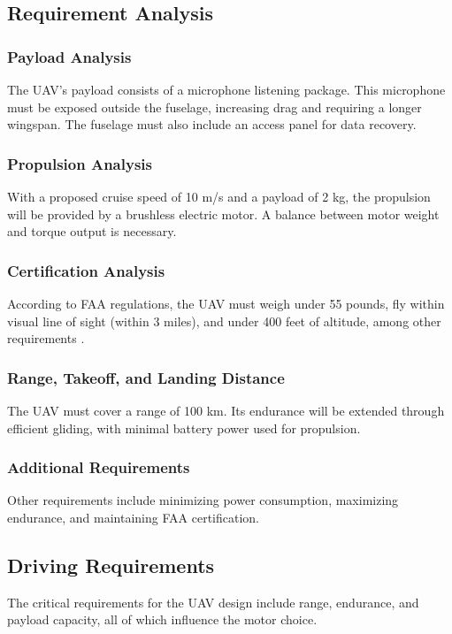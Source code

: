 \documentclass[12pt]{article}
\begin{document}
	\subsection{Requirement Analysis}
	\subsubsection{Payload Analysis}
	The UAV's payload consists of a microphone listening package. This microphone must be exposed outside the fuselage, increasing drag and requiring a longer wingspan. The fuselage must also include an access panel for data recovery.
	
	\subsubsection{Propulsion Analysis}
	With a proposed cruise speed of 10 m/s and a payload of 2 kg, the propulsion will be provided by a brushless electric motor. A balance between motor weight and torque output is necessary.
	
	\subsubsection{Certification Analysis}
	According to FAA regulations, the UAV must weigh under 55 pounds, fly within visual line of sight (within 3 miles), and under 400 feet of altitude, among other requirements \cite{faa_2023}.
	
	\subsubsection{Range, Takeoff, and Landing Distance}
	The UAV must cover a range of 100 km. Its endurance will be extended through efficient gliding, with minimal battery power used for propulsion.
	
	\subsubsection{Additional Requirements}
	Other requirements include minimizing power consumption, maximizing endurance, and maintaining FAA certification.
	
	\subsection{Driving Requirements}
	The critical requirements for the UAV design include range, endurance, and payload capacity, all of which influence the motor choice.
	
\end{document}
